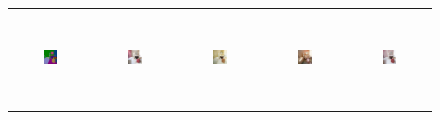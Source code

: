 \begin{figure}[]
\begin{tabular} {cc|cc|c}
\includegraphics[width=0.1932\textwidth,height=0.96in]{Images/Rec/ADE/label/ADE_val_00000107.png} & \includegraphics[width=0.1932\textwidth,height=0.96in]{Images/Rec/ADE/gt/ADE_val_00000107.jpg} &
\includegraphics[width=0.1932\textwidth,height=0.96in]{Images/Rec/ADE/pix2pixhd/ADE_val_00000107.jpg} &   \includegraphics[width=0.1932\textwidth,height=0.96in]{Images/Rec/ADE/spade/ADE_val_00000107.jpg} &  \includegraphics[width=0.1932\textwidth,height=0.96in]{Images/Rec/ADE/ours/ADE_val_00000107.png} \\



\end{tabular}
\end{figure}
